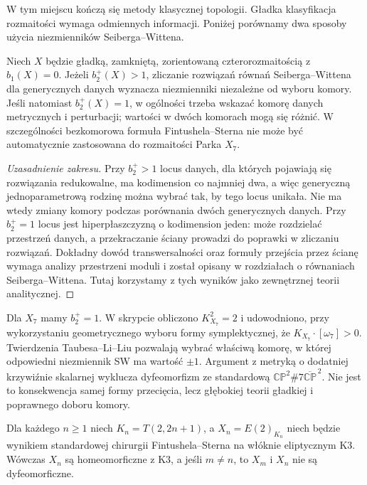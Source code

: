 W tym miejscu kończą się metody klasycznej topologii.
Gładka klasyfikacja rozmaitości wymaga odmiennych informacji.
Poniżej porównamy dwa sposoby użycia niezmienników
Seiberga--Wittena.

\begin{stwierdzenie}
\label{prop:tg-syn-regimes}
Niech $X$ będzie gładką, zamkniętą, zorientowaną
czterorozmaitością z $b_1(X)=0$.
Jeżeli $b_2^+(X)>1$, zliczanie rozwiązań równań
Seiberga--Wittena dla generycznych danych wyznacza
niezmienniki niezależne od wyboru komory. Jeśli natomiast
$b_2^+(X)=1$, w ogólności trzeba wskazać komorę
danych metrycznych i perturbacji; wartości w dwóch
komorach mogą się różnić. W szczególności bezkomorowa
formuła Fintushela--Sterna nie może być automatycznie
zastosowana do rozmaitości Parka $X_7$.
\end{stwierdzenie}

\begin{proof}[Uzasadnienie zakresu]
Przy $b_2^+>1$ locus danych, dla których pojawiają się
rozwiązania redukowalne, ma kodimension co najmniej dwa,
a więc generyczną jednoparametrową rodzinę można wybrać
tak, by tego locus unikała. Nie ma wtedy zmiany komory
podczas porównania dwóch generycznych danych.
Przy $b_2^+=1$ locus jest hiperpłaszczyzną o kodimension jeden:
może rozdzielać przestrzeń danych, a przekraczanie ściany
prowadzi do poprawki w zliczaniu rozwiązań.
Dokładny dowód transwersalności oraz formuły przejścia przez
ścianę wymaga analizy przestrzeni moduli i został opisany
w rozdziałach o równaniach Seiberga--Wittena. Tutaj korzystamy
z tych wyników jako zewnętrznej teorii analitycznej.
\end{proof}

\begin{przyklad}
Dla $X_7$ mamy $b_2^+=1$. W skrypcie obliczono
$K_{X_7}^2=2$ i udowodniono, przy wykorzystaniu
geometrycznego wyboru formy symplektycznej, że
$K_{X_7}\cdot[\omega_7]>0$. Twierdzenia Taubesa--Li--Liu
pozwalają wybrać właściwą komorę, w której odpowiedni
niezmiennik SW ma wartość $\pm1$. Argument z metryką
o dodatniej krzywiźnie skalarnej wyklucza dyfeomorfizm
ze standardową $\mathbb{CP}^2\#7\overline{\mathbb{CP}}^{\,2}$.
Nie jest to konsekwencja samej formy przecięcia, lecz
głębokiej teorii gładkiej i poprawnego doboru komory.
\end{przyklad}

\begin{twierdzenie}
\label{thm:tg-syn-k3}
Dla każdego $n\ge1$ niech $K_n=T(2,2n+1)$,
a $X_n=E(2)_{K_n}$ niech będzie wynikiem standardowej
chirurgii Fintushela--Sterna na włóknie eliptycznym K3.
Wówczas $X_n$ są homeomorficzne z K3, a jeśli $m\ne n$,
to $X_m$ i $X_n$ nie są dyfeomorficzne.
\end{twierdzenie}

